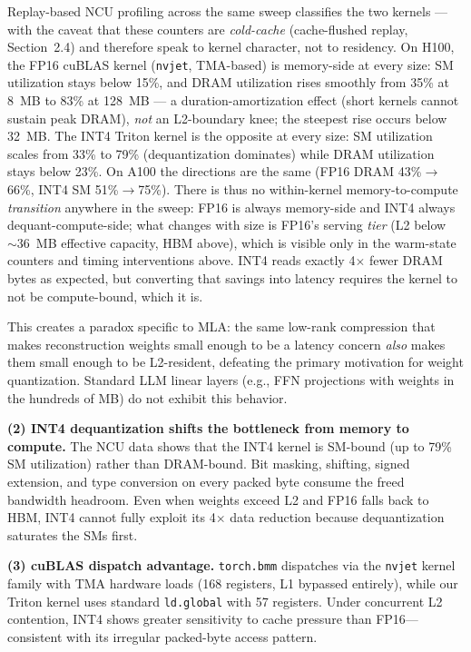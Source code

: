 \documentclass[10pt,twocolumn]{article}
\begin{document}
Replay-based NCU profiling across the same sweep classifies the two kernels --- with the caveat that these counters are \emph{cold-cache} (cache-flushed replay, Section~2.4) and therefore speak to kernel character, not to residency.  On H100, the FP16 cuBLAS kernel (\texttt{nvjet}, TMA-based) is memory-side at every size: SM utilization stays below 15\%, and DRAM utilization rises smoothly from 35\% at 8~MB to 83\% at 128~MB --- a duration-amortization effect (short kernels cannot sustain peak DRAM), \emph{not} an L2-boundary knee; the steepest rise occurs below 32~MB.  The INT4 Triton kernel is the opposite at every size: SM utilization scales from 33\% to 79\% (dequantization dominates) while DRAM utilization stays below 23\%.  On A100 the directions are the same (FP16 DRAM 43\%$\to$66\%, INT4 SM 51\%$\to$75\%).  There is thus no within-kernel memory-to-compute \emph{transition} anywhere in the sweep: FP16 is always memory-side and INT4 always dequant-compute-side; what changes with size is FP16's serving \emph{tier} (L2 below ${\sim}36$~MB effective capacity, HBM above), which is visible only in the warm-state counters and timing interventions above.  INT4 reads exactly 4$\times$ fewer DRAM bytes as expected, but converting that savings into latency requires the kernel to not be compute-bound, which it is.

This creates a paradox specific to MLA: the same low-rank compression that makes reconstruction weights small enough to be a latency concern \emph{also} makes them small enough to be L2-resident, defeating the primary motivation for weight quantization.  Standard LLM linear layers (e.g., FFN projections with weights in the hundreds of MB) do not exhibit this behavior.

\textbf{(2) INT4 dequantization shifts the bottleneck from memory to compute.}  The NCU data shows that the INT4 kernel is SM-bound (up to 79\% SM utilization) rather than DRAM-bound.  Bit masking, shifting, signed extension, and type conversion on every packed byte consume the freed bandwidth headroom.  Even when weights exceed L2 and FP16 falls back to HBM, INT4 cannot fully exploit its 4$\times$ data reduction because dequantization saturates the SMs first.

\textbf{(3) cuBLAS dispatch advantage.}  \texttt{torch.bmm} dispatches via the \texttt{nvjet} kernel family with TMA hardware loads (168 registers, L1 bypassed entirely), while our Triton kernel uses standard \texttt{ld.global} with 57 registers.  Under concurrent L2 contention, INT4 shows greater sensitivity to cache pressure than FP16---consistent with its irregular packed-byte access pattern.
\end{document}
